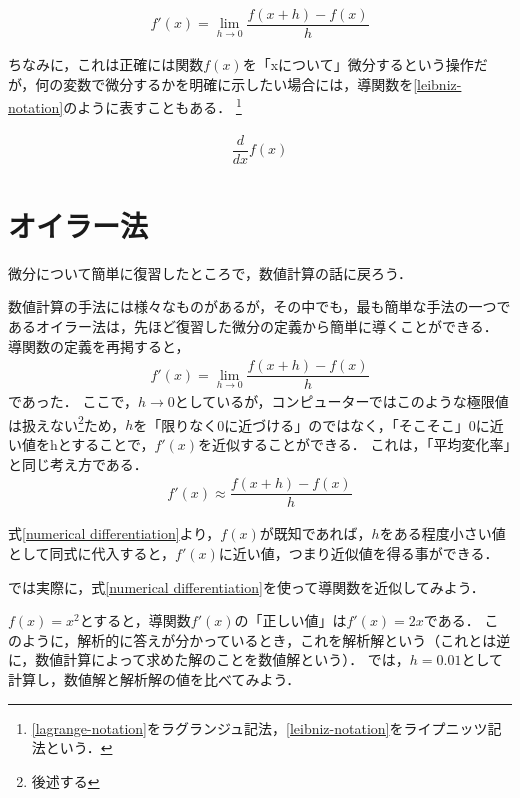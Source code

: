 \begin{align}
f'(x) = \lim_{h \to 0} \dfrac{f(x+h)-f(x)}{h}
\label{lagrange-notation}
\end{align}

ちなみに，これは正確には関数$f(x)$を「xについて」微分するという操作だが，何の変数で微分するかを明確に示したい場合には，導関数を\ref{leibniz-notation}のように表すこともある．
\footnote{\ref{lagrange-notation}をラグランジュ記法，\ref{leibniz-notation}をライプニッツ記法という．}

\begin{align}
\dfrac{d}{dx} f(x)
\label{leibniz-notation}
\end{align}



\section{オイラー法}
微分について簡単に復習したところで，数値計算の話に戻ろう．

数値計算の手法には様々なものがあるが，その中でも，最も簡単な手法の一つであるオイラー法は，先ほど復習した微分の定義から簡単に導くことができる．
導関数の定義を再掲すると，
\begin{align}
f'(x) = \lim_{h \to 0} \dfrac{f(x+h)-f(x)}{h}
\end{align}
であった．
ここで，$h \to 0$としているが，コンピューターではこのような極限値は扱えない\footnote{後述する}ため，$h$を「限りなく0に近づける」のではなく，「そこそこ」0に近い値をhとすることで，$f'(x)$を近似することができる．
これは，「平均変化率」と同じ考え方である．
\begin{align}
f'(x) \approx \dfrac{f(x+h)-f(x)}{h}
\label{numerical-differentiation}
\end{align}

式\ref{numerical differentiation}より，$f(x)$が既知であれば，$h$をある程度小さい値として同式に代入すると，$f'(x)$に近い値，つまり近似値を得る事ができる．

では実際に，式\ref{numerical differentiation}を使って導関数を近似してみよう．


$f(x)=x^2$とすると，導関数$f'(x)$の「正しい値」は$f'(x)=2x$である．
このように，解析的に答えが分かっているとき，これを解析解という（これとは逆に，数値計算によって求めた解のことを数値解という）．
では，$h=0.01$として計算し，数値解と解析解の値を比べてみよう．
\begin{figure}

\label{numerical-differentiation-graph}
\end{figure}

